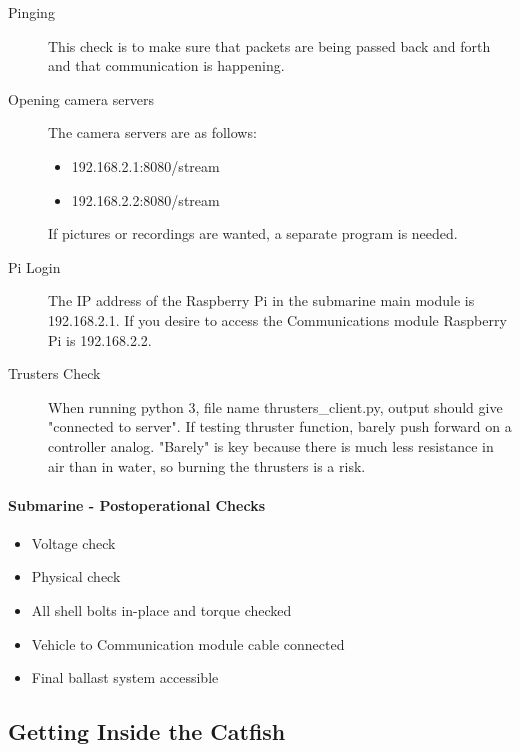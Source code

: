 \documentclass[
10pt, %
a4paper, %
oneside, %
headinclude,footinclude, %
BCOR5mm, %
]{scrartcl}
\begin{document}
\begin{description}
	\item[Pinging] 
	This check is to make sure that packets are being passed back and forth and that communication is happening.
	\item[Opening camera servers] 
	The camera servers are as follows:
	 
	\begin{itemize}[noitemsep]
		\item 192.168.2.1:8080/stream
		\item 192.168.2.2:8080/stream
	\end{itemize}

	If pictures or recordings are wanted, a separate program is needed.
	\item[Pi Login]
	The IP address of the Raspberry Pi in the submarine main module is 192.168.2.1. If you desire to access the Communications module Raspberry Pi is 192.168.2.2.
	\item[Trusters Check] When running python 3, file name thrusters\_client.py, output should give "connected to server". If testing thruster function, barely push forward on a controller analog. "Barely" is key because there is much less resistance in air than in water, so burning the thrusters is a risk.
\end{description}

\paragraph{Submarine - Postoperational Checks}

\begin{itemize}[noitemsep] %
	\item Voltage check
	\item Physical check
	\item All shell bolts in-place and torque checked
	\item Vehicle to Communication module cable connected
	\item Final ballast system accessible
\end{itemize}


\subsection{Getting Inside the Catfish}
\end{document}
